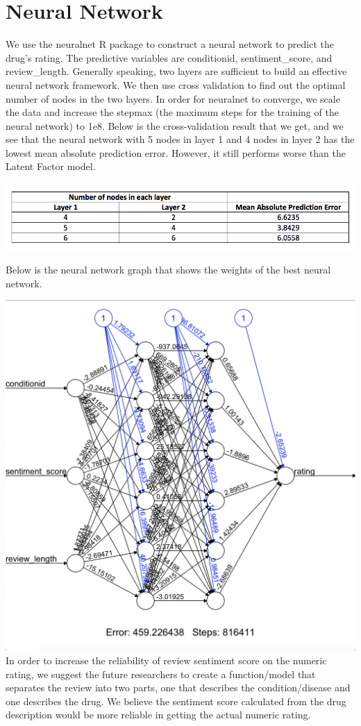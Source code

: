 \documentclass{article}
\begin{document}
\section{Neural Network}
We use the neuralnet R package to construct a neural network to predict 
the drug’s rating. The predictive variables are conditionid, 
sentiment\_score, and review\_length. Generally speaking, two layers are 
sufficient to build an effective neural network framework. We then use 
cross validation to find out the optimal number of nodes in the two layers. 
In order for neuralnet to converge, we scale the data and increase the 
stepmax (the maximum steps for the training of the neural network) to 1e8. 
Below is the cross-validation result that we get, and we see that the 
neural network with 5 nodes in layer 1 and 4 nodes in layer 2 has the 
lowest mean absolute prediction error. However, it still performs worse 
than the Latent Factor model. \newline

\includegraphics[scale=0.4]{nodes_in_each_layer.jpg}

Below is the neural network graph that shows 
the weights of the best neural network. \newline

\includegraphics[scale=0.3]{best_neural.png}
\newline
In order to increase the reliability of review sentiment score on the 
numeric rating, we suggest the future researchers to create a 
function/model that separates the review into two parts, one that 
describes the condition/disease and one describes the drug. 
We believe the sentiment score calculated from the drug description 
would be more reliable in getting the actual numeric rating.  
\end{document}
